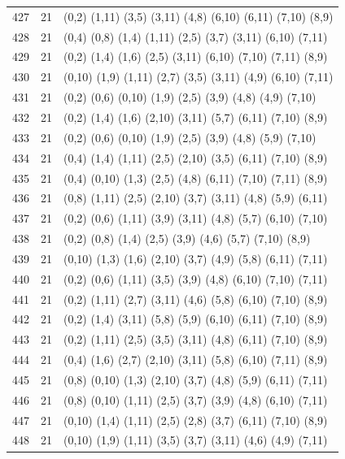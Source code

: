 \begin{appendix}
{\begin{longtable}{lll}
427& 21 & (0,2)   (1,11) (3,5)  (3,11)  (4,8)   (6,10)  (6,11)  (7,10)  (8,9)\\
428& 21 & (0,4)   (0,8)  (1,4)  (1,11)  (2,5)   (3,7)   (3,11)  (6,10)  (7,11)\\
429& 21 & (0,2)   (1,4)  (1,6)  (2,5)   (3,11)  (6,10)  (7,10)  (7,11)  (8,9)\\
430& 21 & (0,10)  (1,9)  (1,11) (2,7)   (3,5)   (3,11)  (4,9)   (6,10)  (7,11)\\
431& 21 & (0,2)   (0,6)  (0,10) (1,9)   (2,5)   (3,9)   (4,8)   (4,9)   (7,10)\\
432& 21 & (0,2)   (1,4)  (1,6)  (2,10)  (3,11)  (5,7)   (6,11)  (7,10)  (8,9)\\
433& 21 & (0,2)   (0,6)  (0,10) (1,9)   (2,5)   (3,9)   (4,8)   (5,9)   (7,10)\\
434& 21 & (0,4)   (1,4)  (1,11) (2,5)   (2,10)  (3,5)   (6,11)  (7,10)  (8,9)\\
435& 21 & (0,4)   (0,10) (1,3)  (2,5)   (4,8)   (6,11)  (7,10)  (7,11)  (8,9)\\
436& 21 & (0,8)   (1,11) (2,5)  (2,10)  (3,7)   (3,11)  (4,8)   (5,9)   (6,11)\\
437& 21 & (0,2)   (0,6)  (1,11) (3,9)   (3,11)  (4,8)   (5,7)   (6,10)  (7,10)\\
438& 21 & (0,2)   (0,8)  (1,4)  (2,5)   (3,9)   (4,6)   (5,7)   (7,10)  (8,9)\\
439& 21 & (0,10)  (1,3)  (1,6)  (2,10)  (3,7)   (4,9)   (5,8)   (6,11)  (7,11)\\
440& 21 & (0,2)   (0,6)  (1,11) (3,5)   (3,9)   (4,8)   (6,10)  (7,10)  (7,11)\\
441& 21 & (0,2)   (1,11) (2,7)  (3,11)  (4,6)   (5,8)   (6,10)  (7,10)  (8,9)\\
442& 21 & (0,2)   (1,4)  (3,11) (5,8)   (5,9)   (6,10)  (6,11)  (7,10)  (8,9)\\
443& 21 & (0,2)   (1,11) (2,5)  (3,5)   (3,11)  (4,8)   (6,11)  (7,10)  (8,9)\\
444& 21 & (0,4)   (1,6)  (2,7)  (2,10)  (3,11)  (5,8)   (6,10)  (7,11)  (8,9)\\
445& 21 & (0,8)   (0,10) (1,3)  (2,10)  (3,7)   (4,8)   (5,9)   (6,11)  (7,11)\\
446& 21 & (0,8)   (0,10) (1,11) (2,5)   (3,7)   (3,9)   (4,8)   (6,10)  (7,11)\\
447& 21 & (0,10)  (1,4)  (1,11) (2,5)   (2,8)   (3,7)   (6,11)  (7,10)  (8,9)\\
448& 21 & (0,10)  (1,9)  (1,11) (3,5)   (3,7)   (3,11)  (4,6)   (4,9)   (7,11)\\

\end{longtable}}
\end{appendix}
